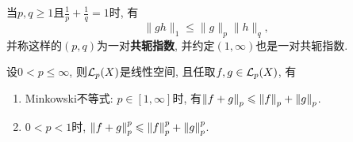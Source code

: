     \begin{Corollary}[H\"older]
            当$ p,q\geqslant 1 $且$ \frac{1}{p}+\frac{1}{q}=1 $时, 有
            \[
            \lVert gh\rVert_1\leqslant\lVert g\rVert_p\lVert h\rVert_q,
            \]
            并称这样的$ (p,q) $为一对\textbf{共轭指数}, 并约定$ (1,\infty) $也是一对共轭指数.
    \end{Corollary}

    \begin{Theorem}
    设$ 0<p\leqslant\infty $, 则$ \mathcal{L}_p(X) $是线性空间, 且任取$ f, g\in\mathcal{L}_p(X) $, 有
    \begin{enumerate}[(1)]
    \item Minkowski不等式: $ p\in[1,\infty] $时, 有$ \left\| f+g \right\|_p\leqslant\left\| f \right\|_p+\left\| g \right\|_p $.
    \item $ 0<p<1 $时, $ \left\| f+g \right\|_p^p\leqslant \left\| f \right\|_p^p+\left\| g \right\|_p^p $.
    \end{enumerate}
    \end{Theorem}
